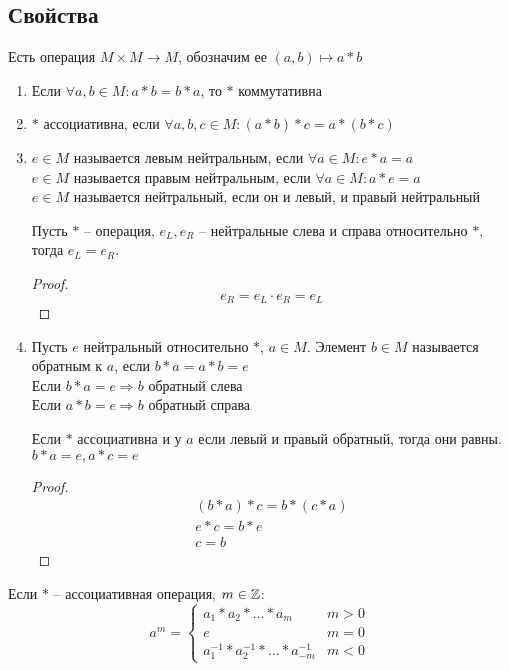 \documentclass[main]{subfiles}
\begin{document}
\subsection{Свойства}
Есть операция $M \times M \to M$, обозначим ее $(a,b) \mapsto a*b$
\begin{enumerate}
    \item Если $\forall a,b \in M: a*b = b*a$, то $*$ коммутативна
    \item $*$ ассоциативна, если  $\forall a,b,c \in M: (a*b)*c = a*(b*c)$
    \item $e\in M$ называется левым нейтральным, если $\forall a \in M: e*a=a$
          \\
          $e\in M$ называется правым нейтральным, если $\forall a \in M: a*e=a$\\
          $e\in M$ называется нейтральный, если он и левый, и правый нейтральный
          \begin{lemma}
              Пусть $*$ -- операция, $e_L, e_R$ -- нейтральные слева
              и справа относительно $*$, тогда $e_L = e_R$.
          \end{lemma}
          \begin{proof}
              \[e_R = e_L \cdot e_R = e_L\]
          \end{proof}
    \item {}
          Пусть $e$ нейтральный относительно $*$, $a\in M$. Элемент $b \in M$
          называется обратным к $a$, если $b*a = a*b = e$\\
          Если $b*a = e \Rightarrow b$ обратный слева\\
          Если $a*b = e \Rightarrow b$ обратный справа
          \begin{lemma}
              Если $*$ ассоциативна и у $a$ если левый и правый обратный,
              тогда они равны. $b*a=e, a*c=e$
          \end{lemma}
          \begin{proof}
              \begin{gather*}
                  (b*a)*c=b*(c*a)\\
                  e*c =b*e\\
                  c=b
              \end{gather*}
          \end{proof}
\end{enumerate}

Если $*$ -- ассоциативная операция, $m \in \mathbb{Z}$:
\begin{equation*}
    a^m =
    \begin{cases}
        a_1 * a_2 * \ldots * a_m                  & m > 0 \\
        e                                         & m = 0 \\
        a_1^{-1}* a_2^{-1} * \ldots * a_{-m}^{-1} & m < 0
    \end{cases}
\end{equation*}
\end{document}
